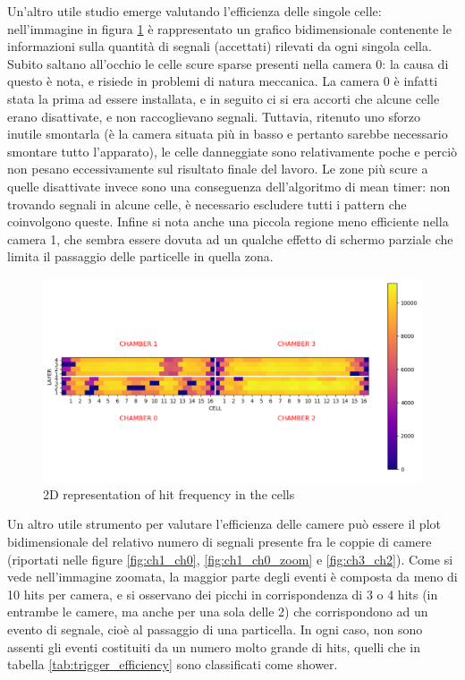 \documentclass[a4paper,11pt]{book}
\begin{document}
Un'altro utile studio emerge valutando l'efficienza delle singole celle: nell'immagine in figura \ref{fig:hit_freq} è rappresentato un grafico bidimensionale contenente le informazioni sulla quantità di segnali (accettati) rilevati da ogni singola cella. Subito saltano all'occhio le celle scure sparse presenti nella camera 0: la causa di questo è nota, e risiede in problemi di natura meccanica. La camera 0 è infatti stata la prima ad essere installata, e in seguito ci si era accorti che alcune celle erano disattivate, e non raccoglievano segnali. Tuttavia, ritenuto uno sforzo inutile smontarla (è la camera situata più in basso e pertanto sarebbe necessario smontare tutto l'apparato), le celle danneggiate sono relativamente poche e perciò non pesano eccessivamente sul risultato finale del lavoro. Le zone più scure a quelle disattivate invece sono una conseguenza dell'algoritmo di mean timer: non trovando segnali in alcune celle, è necessario escludere tutti i pattern che coinvolgono queste. Infine si nota anche una piccola regione meno efficiente nella camera 1, che sembra essere dovuta ad un qualche effetto di schermo parziale che limita il passaggio delle particelle in quella zona.\\

\begin{figure}[hbtp]
\centering
\includegraphics[scale=0.7]{pictures/Hit_matrix.pdf}
\caption{2D representation of hit frequency in the cells}
\label{fig:hit_freq}
\end{figure}

Un altro utile strumento per valutare l'efficienza delle camere può essere il plot bidimensionale del relativo numero di segnali presente fra le coppie di camere (riportati nelle figure \ref{fig:ch1_ch0}, \ref{fig:ch1_ch0_zoom} e \ref{fig:ch3_ch2}). Come si vede nell'immagine zoomata, la maggior parte degli eventi è composta da meno di 10 hits per camera, e si osservano dei picchi in corrispondenza di 3 o 4 hits (in entrambe le camere, ma anche per una sola delle 2) che corrispondono ad un evento di segnale, cioè al passaggio di una particella. In ogni caso, non sono assenti gli eventi costituiti da un numero molto grande di hits, quelli che in tabella \ref{tab:trigger_efficiency} sono classificati come shower. 
\end{document}
